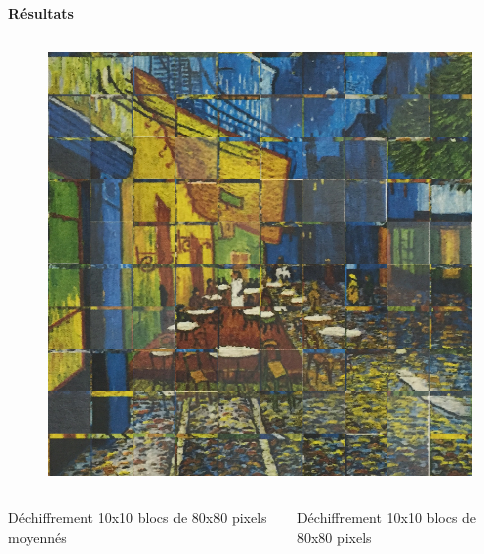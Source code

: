 \documentclass{beamer}
\begin{document}
\begin{frame}[t]
\begin{columns}[t]
\begin{column}{.5\linewidth}
\begin{block}{\centering \textbf{Résultats}}
\begin{columns}[t]
                        \begin{column}{.2\linewidth}
                            \begin{figure}[t]
                                \includegraphics[width=\linewidth]{rsc/van_gogh_picture_10_d.png}\\
                            \end{figure}
                        \end{column}
                    \end{columns}

                    \begin{columns}[t]
                        \begin{column}{.5\linewidth}
                            \begin{center}
                                {\small Déchiffrement 10x10 blocs de 80x80 pixels moyennés}
                            \end{center}
                        \end{column}

                        \begin{column}{.5\linewidth}
                            \begin{center}
                                {\small Déchiffrement 10x10 blocs de 80x80 pixels}
                            \end{center}
                        \end{column}
                    \end{columns}
                \end{block}
            \end{column}
        \end{columns}


\end{frame}
\end{document}
